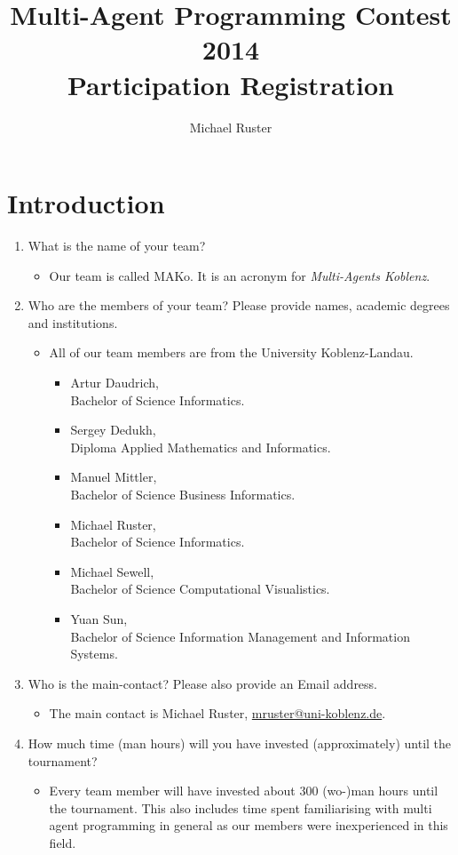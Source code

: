\documentclass{llncs}
\begin{document}
\title{Multi-Agent Programming Contest 2014\\Participation Registration}
\author{Michael Ruster}
\maketitle

\section*{Introduction}

\begin{enumerate}
\item What is the name of your team?
  \begin{itemize}
    \item Our team is called MAKo. It is an acronym for \emph{Multi-Agents Koblenz}.
  \end{itemize}
\item Who are the members of your team? Please provide names, academic degrees and institutions.
  \begin{itemize}
    \item All of our team members are from the University Koblenz-Landau.\begin{itemize}
    \item Artur Daudrich,\\Bachelor of Science Informatics.
    \item Sergey Dedukh,\\Diploma Applied Mathematics and Informatics.
    \item Manuel Mittler,\\Bachelor of Science Business Informatics.
    \item Michael Ruster,\\Bachelor of Science Informatics.
    \item Michael Sewell,\\Bachelor of Science Computational Visualistics.
    \item Yuan Sun,\\Bachelor of Science Information Management and Information Systems.
  \end{itemize}
  \end{itemize}
\item Who is the main-contact? Please also provide an Email address.
  \begin{itemize}
    \item The main contact is Michael Ruster, \href{mailto:mruster@uni-koblenz.de}{mruster@uni-koblenz.de}.
  \end{itemize}
\item How much time (man hours) will you have invested (approximately) until the tournament?
  \begin{itemize}
    \item Every team member will have invested about 300 (wo-)man hours until the tournament. This also includes time spent familiarising with multi agent programming in general as our members were inexperienced in this field.
  \end{itemize}


\end{enumerate}
\end{document}

